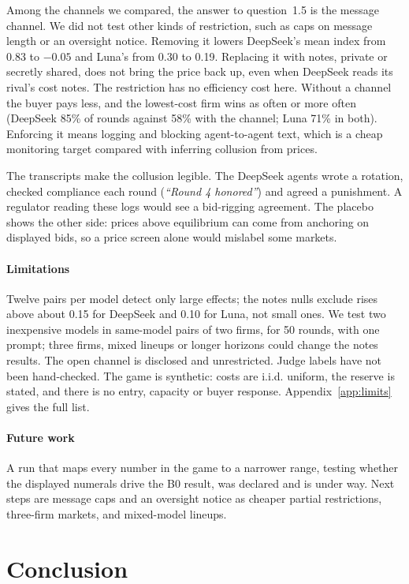 \documentclass[10pt]{article}
\newcommand{\Bzero}{B0}
\begin{document}
Among the channels we compared, the answer to question~1.5 is the message channel. We did not test other kinds of restriction, such as caps on message length or an oversight notice. Removing it lowers DeepSeek's mean index from 0.83 to $-0.05$ and Luna's from 0.30 to 0.19. Replacing it with notes, private or secretly shared, does not bring the price back up, even when DeepSeek reads its rival's cost notes. The restriction has no efficiency cost here. Without a channel the buyer pays less, and the lowest-cost firm wins as often or more often (DeepSeek 85\% of rounds against 58\% with the channel; Luna 71\% in both). Enforcing it means logging and blocking agent-to-agent text, which is a cheap monitoring target compared with inferring collusion from prices.

The transcripts make the collusion legible. The DeepSeek agents wrote a rotation, checked compliance each round (\emph{``Round 4 honored''}) and agreed a punishment. A regulator reading these logs would see a bid-rigging agreement. The placebo shows the other side: prices above equilibrium can come from anchoring on displayed bids, so a price screen alone would mislabel some markets.

\paragraph{Limitations} Twelve pairs per model detect only large effects; the notes nulls exclude rises above about 0.15 for DeepSeek and 0.10 for Luna, not small ones. We test two inexpensive models in same-model pairs of two firms, for 50 rounds, with one prompt; three firms, mixed lineups or longer horizons could change the notes results. The open channel is disclosed and unrestricted. Judge labels have not been hand-checked. The game is synthetic: costs are i.i.d. uniform, the reserve is stated, and there is no entry, capacity or buyer response. Appendix~\ref{app:limits} gives the full list.

\paragraph{Future work} A run that maps every number in the game to a narrower range, testing whether the displayed numerals drive the \Bzero{} result, was declared and is under way. Next steps are message caps and an oversight notice as cheaper partial restrictions, three-firm markets, and mixed-model lineups.

\section{Conclusion}
\end{document}
